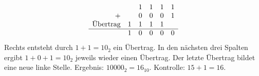 \begin{frame}
\end{frame}

\begin{frame}
\[
    \begin{array}{rccccc}
        & & 1 & 1 & 1 & 1 \\
        + & & 0 & 0 & 0 & 1 \\
        \text{Übertrag} & 1 & 1 & 1 & 1 & \\\hline
        & 1 & 0 & 0 & 0 & 0
    \end{array}
\]
Rechts entsteht durch $1+1=10_2$ ein Übertrag. In den nächsten drei Spalten ergibt $1+0+1=10_2$ jeweils wieder einen Übertrag. Der letzte Übertrag bildet eine neue linke Stelle. Ergebnis: $10000_2=16_{10}$. Kontrolle: $15+1=16$.
\end{frame}
